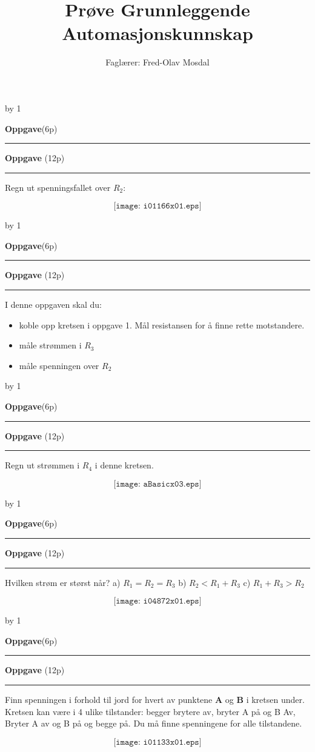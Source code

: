\documentclass[12pt,a4paper]{article}
\def\oppgave{
            \advance\questnum by 1
	    \ifthenelse{\questnum>0\AND \questnum<9}
	    {
                \vskip 1cm
		\textbf{Oppgave}\hskip 5pt\the\questnum \hfill \hfill(6p)
		\vskip 3pt
		\hrule
	\vskip 0.5cm}
	{
                \vskip 1cm
		\textbf{Oppgave}\hskip 5pt \the\questnum \hfill \hfill(12p)
		\vskip 3pt \hrule \vskip 0.5cm }

		}
\begin{document}
\title{Prøve Grunnleggende Automasjonskunnskap}
\author{Faglærer: Fred-Olav Mosdal\\}
\maketitle
\oppgave{}%
\vskip 2.5pt 
Regn ut spenningsfallet over $R_2$:

$$\texttt{[image: i01166x01.eps]}$$
\vskip 2.5pt 

\vskip 2.5pt 

\vskip 2.5pt 
\newpage
\oppgave{}%
\vskip 2.5pt 
I denne oppgaven skal du:
\begin{itemize}
	\item koble opp kretsen i oppgave 1. Mål resistansen for å finne rette motstandere. 
	\item måle strømmen i $R_3$
	\item måle spenningen over $R_2$
\end{itemize}
\vskip 2.5pt 
\newpage
\oppgave{}%
\vskip 2.5pt 
Regn ut strømmen i $R_4$ i denne kretsen. 

$$\texttt{[image: aBasicx03.eps]}$$

\vskip 2.5pt 

\vskip 2.5pt 
\newpage


\oppgave{}%
\vskip 2.5pt 
Hvilken strøm er størst når?
\vskip 10pt
a) $R_1=R_2=R_3$
\vskip 10pt
b) $R_2<R_1 + R_3$
\vskip 10pt
c) $R_1+R_3>R_2$
\vskip 10pt

$$\texttt{[image: i04872x01.eps]}$$

\vskip 5pt 
\vskip 2.5pt 
\newpage
\oppgave{}%
\vskip 2.5pt 
Finn spenningen i forhold til jord for hvert av punktene \textbf{A} og \textbf{B} i kretsen under. 
Kretsen kan være i 4 ulike tilstander: begger brytere av, bryter A på og B Av, Bryter A av og B på og begge på. Du må finne spenningene for alle tilstandene. 

$$\texttt{[image: i01133x01.eps]}$$

\end{document}
